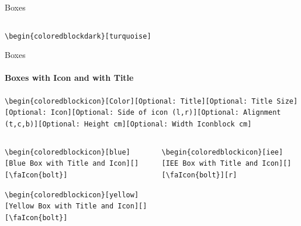 \documentclass[aspectratio=169]{beamer}
\begin{document}
\begin{frame}{Boxes}
\begin{columns}
\begin{column}{0.49\textwidth}
        \end{column}
    \end{columns}

    \centering
    \begin{minipage}[t]{0.49\textwidth}
        \begin{coloredblockdark}[turquoise]
                \footnotesize\texttt{\textbackslash begin\{coloredblockdark\}[turquoise]}\strut
        \end{coloredblockdark}
        
    \end{minipage}
\end{frame}

\begin{frame}{Boxes}
    \framesubtitle{Boxes with Icon and with Title}

    \begin{coloredblock}[grey]
        \footnotesize\centering\texttt{\textbackslash begin\{coloredblockicon\}[Color][Optional:~Title][Optional:~Title~Size] [Optional:~Icon][Optional:~Side~of~icon (l,r)][Optional:~Alignment (t,c,b)][Optional:~Height~cm][Optional:~Width~Iconblock~cm]}
    \end{coloredblock}

    \vspace{-1cm}
    \begin{columns}
        \begin{column}{0.49\textwidth}

            \begin{coloredblockicon}
                \footnotesize\texttt{\textbackslash begin\{coloredblockicon\}[blue][Blue Box with Title and Icon][][\textbackslash faIcon\{bolt\}]}\strut
            \end{coloredblockicon}
    
            \begin{coloredblockicon}
                \footnotesize\texttt{\textbackslash begin\{coloredblockicon\}[yellow] [Yellow Box with Title and Icon][][\textbackslash faIcon\{bolt\}]}\strut
            \end{coloredblockicon}

        \end{column}
        \begin{column}{0.49\textwidth}
        
            \begin{coloredblockicon}
                \footnotesize\texttt{\textbackslash begin\{coloredblockicon\}[iee][IEE Box with Title and Icon][][\textbackslash faIcon\{bolt\}][r]}\strut
            \end{coloredblockicon}
    

\end{column}
\end{columns}
\end{frame}
\end{document}
